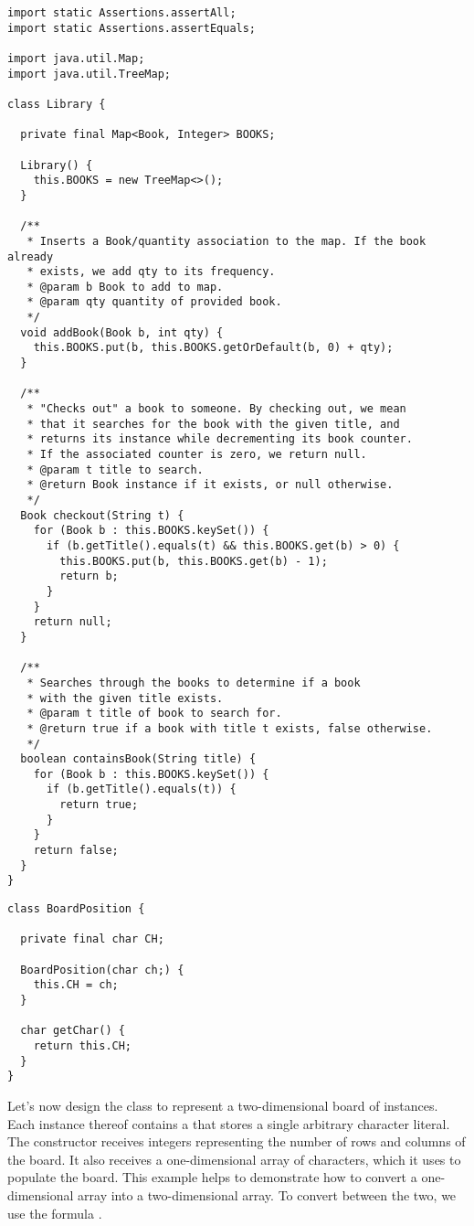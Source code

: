 \begin{lstlisting}[language=MyJava]
import static Assertions.assertAll;
import static Assertions.assertEquals;

import java.util.Map;
import java.util.TreeMap;

class Library {

  private final Map<Book, Integer> BOOKS;

  Library() {
    this.BOOKS = new TreeMap<>();
  }

  /**
   * Inserts a Book/quantity association to the map. If the book already
   * exists, we add qty to its frequency.
   * @param b Book to add to map.
   * @param qty quantity of provided book.
   */
  void addBook(Book b, int qty) {
    this.BOOKS.put(b, this.BOOKS.getOrDefault(b, 0) + qty);
  }

  /**
   * "Checks out" a book to someone. By checking out, we mean
   * that it searches for the book with the given title, and
   * returns its instance while decrementing its book counter.
   * If the associated counter is zero, we return null.
   * @param t title to search.
   * @return Book instance if it exists, or null otherwise.
   */
  Book checkout(String t) {
    for (Book b : this.BOOKS.keySet()) {
      if (b.getTitle().equals(t) && this.BOOKS.get(b) > 0) {
        this.BOOKS.put(b, this.BOOKS.get(b) - 1);
        return b;
      }
    }
    return null;
  }

  /** 
   * Searches through the books to determine if a book
   * with the given title exists.
   * @param t title of book to search for.
   * @return true if a book with title t exists, false otherwise.
   */
  boolean containsBook(String title) {
    for (Book b : this.BOOKS.keySet()) {
      if (b.getTitle().equals(t)) {
        return true;
      }
    }
    return false;
  }
}
\end{lstlisting}


\begin{lstlisting}[language=MyJava]
class BoardPosition {

  private final char CH;

  BoardPosition(char ch;) {
    this.CH = ch;
  }

  char getChar() { 
    return this.CH; 
  }
}
\end{lstlisting}

Let's now design the  class to represent a two-dimensional board of  instances.
Each instance thereof contains a  that stores a single arbitrary character literal.
The  constructor receives integers representing the number of rows and columns of the board.
It also receives a one-dimensional array of characters, which it uses to populate the board.
This example helps to demonstrate how to convert a one-dimensional array into a two-dimensional array.
To convert between the two, we use the formula .

